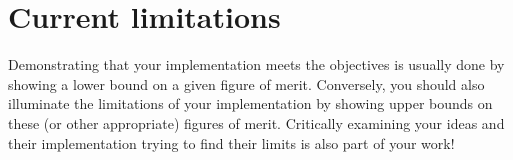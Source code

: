 

\section{Current limitations}
\label{sec:results_limitations}

Demonstrating that your implementation meets the objectives is usually done by showing a lower bound on a given figure of merit.
Conversely, you should also illuminate the limitations of your implementation by showing upper bounds on these (or other appropriate) figures of merit.
Critically examining your ideas and their implementation trying to find their limits is also part of your work!